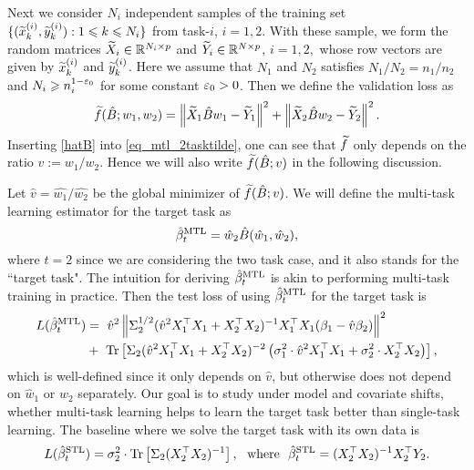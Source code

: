 Next we consider $N_i$ independent samples of the training set $\{(\widetilde x_k^{(i)},\widetilde y_k^{(i)}): 1\leqslant k \leqslant N_i\}$ from task-$i$, $i=1,2$. With these sample, we form the random matrices $\widetilde X_i \in \mathbb{R}^{N_i\times p}$ and $\widetilde Y_i\in \mathbb{R}^{N\times p}$, $i=1,2,$ whose row vectors are given by $\widetilde x_k^{(i)}$ and $\widetilde y_k^{(i)}$. Here we assume that $N_1$ and $N_2$ satisfies $N_1/N_2=n_1/n_2$ and $N_i \geqslant n_i^{1-{\varepsilon}_0}$ for some constant ${\varepsilon}_0>0$. Then we define the validation loss as
\begin{align}\label{eq_mtl_2tasktilde}
	\widetilde f(\hat B; w_1,w_2) = \left\| \widetilde X_1 \hat B w_1 - \widetilde Y_1 \right\|^2 + \left\| \widetilde X_2 \hat B w_2 - \widetilde Y_2 \right\|^2.
\end{align}
Inserting \eqref{hatB} into \eqref{eq_mtl_2tasktilde}, one can see that $\widetilde f$ only depends on the ratio $v:=w_1/w_2$. Hence we will also write $\widetilde f(\hat B; v)$ in the following discussion.

Let $\hat v=\hat{w_1}/\hat{w_2}$ be the global minimizer of $\widetilde f(\hat B; v)$. We will define the multi-task learning estimator for the target task as
	\[ \hat{\beta}_t^{\text{MTL}} = \hat{w}_{2}\hat{B}(\hat{w}_1, \hat{w}_2), \]
	where $t=2$ since we are considering the two task case, and it also stands for the ``target task". 
The intuition for deriving $\hat{\beta}_t^{\text{MTL}}$ is akin to performing multi-task training in practice.
Then the test loss of using $\hat{\beta}_t^{\text{MTL}}$ for the target task is
\begin{align}
	L(\hat{\beta}_t^{\text{MTL}}) &=~ \hat{v}^2 \left\| \Sigma_2^{1/2}(\hat{v}^2 X_1^{\top}X_1 + X_2^{\top}X_2)^{-1} X_1^{\top}X_1 (\beta_1 - \hat{v} \beta_2) \right\|^2 \nonumber \\
			&+~  \operatorname{Tr}\left[\Sigma_2(\hat{v}^2 X_1^{\top}X_1 + X_2^{\top}X_2)^{-2}\left(\sigma_1^2 \cdot \hat v^2  X_1^{\top}X_1 + \sigma_2^2  \cdot X_2^{\top}X_2\right) \right], \label{eq_te_mtl_2task}
\end{align}
which is well-defined since it only depends on $\hat v$, but otherwise does not depend on $\hat w_1$ or $\hat w_2$ separately. Our goal is to study under model and covariate shifts, whether multi-task learning helps to learn the target task better than single-task learning.
The baseline where we solve the target task with its own data is
\begin{align*}
	L(\hat{\beta}_t^{\STL}) = \sigma_2^2 \cdot \bigtr{\Sigma_2(X_2^{\top}X_2)^{-1}}, \ \text{ where } \ \hat{\beta}_t^{\STL} = (X_2^{\top}X_2)^{-1} X_2^{\top}Y_2.
\end{align*}

